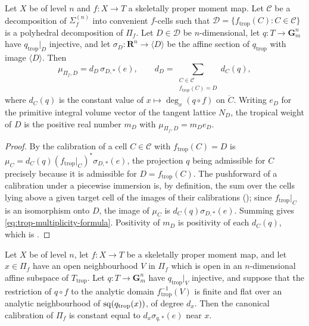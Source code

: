 \begin{theorem}
\label{thm:trop-multiplicity-formula}
Let $X$ be of level $n$ and $f:X\to T$ a skeletally proper moment map. Let
$\mathscr C$ be a decomposition of $\Sigma_f^{(n)}$ into convenient
$f$-cells such that $\mathscr D=\{f_{\mathrm{trop}}(C):C\in\mathscr C\}$ is a
polyhedral decomposition of $\Pi_f$. Let $D\in\mathscr D$ be
$n$-dimensional, let $q:T\to\mathbf G_m^n$ have $q_{\mathrm{trop}}|_D$
injective, and let $\sigma_D:\mathbf R^n\to\langle D\rangle$ be the affine
section of $q_{\mathrm{trop}}$ with image $\langle D\rangle$. Then
\begin{equation}
\label{eq:trop-multiplicity-formula}
 \mu_{\Pi_f,D}=d_D\,\sigma_{D,*}(e),
 \qquad
 d_D=\sum_{\substack{C\in\mathscr C\\ f_{\mathrm{trop}}(C)=D}}d_C(q),
\end{equation}
where $d_C(q)$ is the constant value of $x\mapsto\deg_x(q\circ f)$ on
$\mathring C$. Writing $e_D$ for the primitive integral volume vector of the
tangent lattice $N_D$, the tropical weight of $D$ is the positive real
number $m_D$ with $\mu_{\Pi_f,D}=m_De_D$.
\end{theorem}

\begin{proof}
By  the calibration of a cell
$C\in\mathscr C$ with $f_{\mathrm{trop}}(C)=D$ is
$\mu_C=d_C(q)(f_{\mathrm{trop}}|_C)^*\sigma_{D,*}(e)$, the projection $q$
being admissible for $C$ precisely because it is admissible for
$D=f_{\mathrm{trop}}(C)$. The pushforward of a calibration under a piecewise
immersion is, by definition, the sum over the cells lying above a given
target cell of the images of their calibrations
(); since $f_{\mathrm{trop}}|_C$ is an
isomorphism onto $D$, the image of $\mu_C$ is $d_C(q)\sigma_{D,*}(e)$.
Summing gives \eqref{eq:trop-multiplicity-formula}. Positivity of $m_D$ is
positivity of each $d_C(q)$, which is .
\end{proof}

\begin{proposition}
\label{prop:trop-multiplicity-local}
Let $X$ be of level $n$, let $f:X\to T$ be a skeletally proper moment map,
and let $x\in\Pi_f$ have an open neighbourhood $V$ in $\Pi_f$ which is
open in an $n$-dimensional affine subspace of $T_{\mathrm{trop}}$.
Let $q:T\to\mathbf G_m^n$ have
$q_{\mathrm{trop}}|_V$ injective, and suppose that the restriction of
$q\circ f$ to the analytic domain $f_{\mathrm{trop}}^{-1}(V)$ is finite
and flat over an analytic neighbourhood of
$\operatorname{sq}(q_{\mathrm{trop}}(x))$, of degree $d_x$. Then the canonical calibration
of $\Pi_f$ is constant equal to $d_x\sigma_{q,*}(e)$ near $x$.
\end{proposition}

